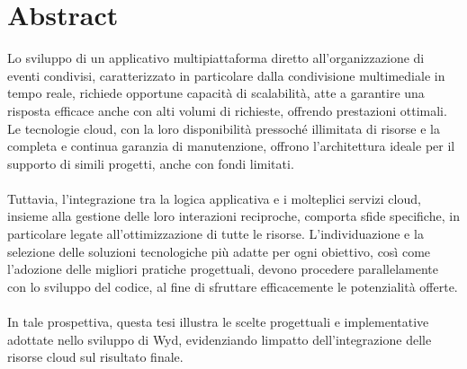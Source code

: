 

\chapter*{Abstract}


Lo sviluppo di un applicativo multipiattaforma diretto all'organizzazione di eventi condivisi,
caratterizzato in particolare dalla condivisione multimediale in tempo reale,
richiede opportune capacità di scalabilità, 
atte a garantire una risposta efficace anche con alti volumi di richieste, offrendo prestazioni ottimali. 
Le tecnologie cloud, con la loro disponibilità pressoché illimitata di risorse e la completa e continua garanzia  di manutenzione, 
offrono l'architettura ideale per il supporto di simili progetti, anche con fondi limitati.\\
\\
Tuttavia, l'integrazione tra la logica applicativa e i molteplici servizi cloud, 
insieme alla gestione delle loro interazioni reciproche, comporta sfide specifiche, 
in particolare legate all'ottimizzazione di tutte le risorse.
L'individuazione e la selezione delle soluzioni tecnologiche più adatte per ogni obiettivo, 
così come l'adozione delle migliori pratiche progettuali,
devono procedere parallelamente con lo sviluppo del codice, 
al fine di sfruttare efficacemente le potenzialità offerte.\\
\\
In tale prospettiva, 
questa tesi illustra le scelte progettuali e implementative adottate nello sviluppo di Wyd, 
evidenziando limpatto dell'integrazione delle risorse cloud sul risultato finale.\\
\clearpage